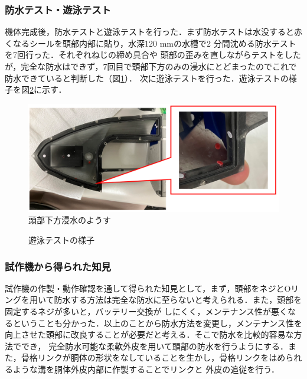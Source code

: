 \subsubsection{防水テスト・遊泳テスト}
機体完成後，防水テストと遊泳テストを行った．まず防水テストは水没すると赤くなるシールを頭部内部に貼り，水深120 mmの水槽で2 分間沈める防水テストを7回行った．それぞれねじの締め具合や
頭部の歪みを直しながらテストをしたが，完全な防水はできず，7回目で頭部下方のみの浸水にとどまったのでこれで防水できていると判断した（図\ref{fig:bousuitest_sisaku}）．
次に遊泳テストを行った．遊泳テストの様子を図\ref{fig:test_sisaku}に示す．

\begin{figure}[t]
    \centering
    \includegraphics[width=0.80\linewidth]{chapters/picture/bousuitest.png}
    \caption{頭部下方浸水のようす}
    \label{fig:bousuitest_sisaku}
\end{figure}
\begin{figure}[t]
    \centering
    \caption{遊泳テストの様子}
    \label{fig:test_sisaku}
\end{figure}

\subsubsection{試作機から得られた知見}
試作機の作製・動作確認を通して得られた知見として，まず，頭部をネジとOリングを用いて防水する方法は完全な防水に至らないと考えられる．また，頭部を固定するネジが多いと，バッテリー交換が
しにくく，メンテナンス性が悪くなるということも分かった．以上のことから防水方法を変更し，メンテナンス性を向上させた頭部に改良することが必要だと考える．そこで防水を比較的容易な方法ででき，
完全防水可能な柔軟外皮を用いて頭部の防水を行うようにする．また，骨格リンクが胴体の形状をなしていることを生かし，骨格リンクをはめられるような溝を胴体外皮内部に作製することでリンクと
外皮の追従を行う．